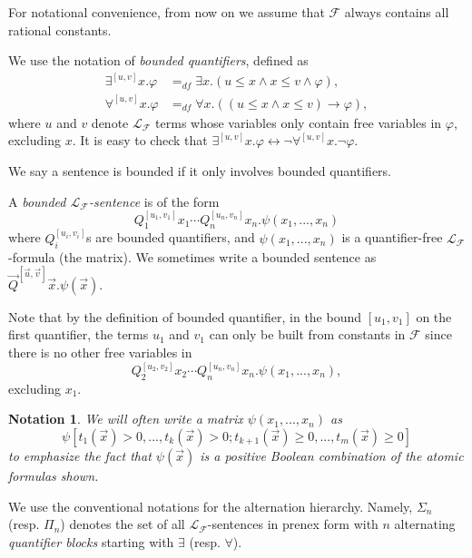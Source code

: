 \documentclass[envcountsect]{llncs}
\newtheorem{notation}[theorem]{Notation}
\begin{document}
For notational convenience, from now on we assume that $\mathcal{F}$ always contains all rational constants. 

\begin{definition}
We use the notation of {\em bounded quantifiers}, defined as
\begin{align*}
\exists^{[u,v]}x.\varphi &=_{df}\exists x. ( u \leq x \land x \leq v \wedge \varphi),\\
\forall^{[u,v]}x.\varphi &=_{df} \forall x. ( (u \leq x \land x \leq v) \rightarrow \varphi),
\end{align*}
where $u$ and $v$ denote $\mathcal{L}_{\mathcal{F}}$ terms whose variables only contain free variables in $\varphi$, excluding $x$. It is easy to check that $\exists^{[u,v]}x. \varphi \leftrightarrow \neg \forall^{[u,v]}x. \neg\varphi$. 
\end{definition}

We say a sentence is bounded if it only involves bounded quantifiers. 

\begin{definition}
A {\em bounded $\mathcal{L}_{\mathcal{F}}$-sentence} is of the form
$$Q_1^{[u_1,v_1]}x_1\cdots Q_n^{[u_n,v_n]}x_n. \psi(x_1,...,x_n)$$
where $Q_i^{[u_i,v_i]}$s are bounded quantifiers, and $\psi(x_1,...,x_n)$ is a quantifier-free $\mathcal{L}_{\mathcal{F}}$-formula (the matrix). We sometimes write a bounded sentence as $\vec Q^{[\vec u,\vec v]}\vec x.\psi(\vec x)$. 
 
\end{definition}

\begin{remark} Note that by the definition of bounded quantifier, in the bound $[u_1,v_1]$ on the first quantifier, the terms $u_1$ and $v_1$ can only be built from constants in $\mathcal{F}$ since there is no other free variables in 
$$Q_2^{[u_2,v_2]}x_2\cdots Q_n^{[u_n,v_n]}x_n.\psi(x_1,...,x_n),$$ excluding $x_1$. 
\end{remark}


\begin{notation}
We will often write a matrix $\psi(x_1,...,x_n)$ as 
$$\psi[t_1(\vec x)>0,...,t_k(\vec x)>0; t_{k+1}(\vec x)\geq 0,...,t_m(\vec x)\geq 0]$$
to emphasize the fact that $\psi(\vec x)$ is a positive Boolean combination of the atomic formulas shown. 
\end{notation}

We use the conventional notations for the alternation hierarchy. Namely, $\Sigma_n$ (resp. $\Pi_n$) denotes the set of all $\mathcal{L}_{\mathcal{F}}$-sentences in prenex form with $n$ alternating {\em quantifier blocks} starting with $\exists$ (resp. $\forall$). 
\end{document}

